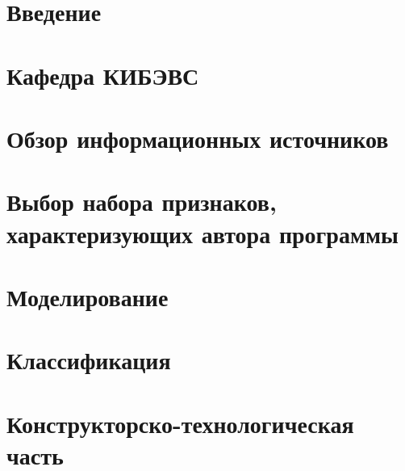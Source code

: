 
 

\newpage
%  
 
 \newpage
 
 
 
 
 \newpage
{}
 \tableofcontents

\newpage
\setcounter{section}{0}
\section*{Введение}


\newpage
\section{Кафедра КИБЭВС}



\newpage 
\section{Обзор информационных источников }







\newpage 
\section{Выбор набора признаков, характеризующих автора программы}\label{features}
 
 
\newpage  
\section{Моделирование}\label{modeling}

 
% 
 
\newpage  
\section{Классификация}\label{classifiers}



\newpage
\section{Конструкторско-технологическая часть}









